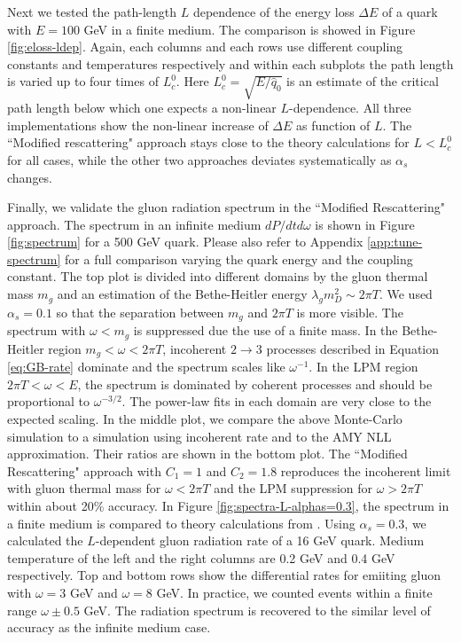 \documentclass[aps, prc, reprint, amsmath, groupedaddress, nofootinbib]{revtex4-1}
\begin{document}
Next we tested the path-length $L$ dependence of the energy loss $\Delta E$ of a quark with $E = 100$ GeV in a finite medium.
The comparison is showed in Figure \ref{fig:eloss-ldep}.
Again, each columns and each rows use different coupling constants and temperatures respectively and within each subplots the path length is varied up to four times of $L_c^0$.
Here $L_c^0 = \sqrt{E/\hat{q}_0}$ is an estimate of the critical path length below which one expects a non-linear $L$-dependence.
All three implementations show the non-linear increase of $\Delta E$ as function of $L$.
The ``Modified rescattering" approach stays close to the theory calculations for $L<L_c^0$ for all cases, while the other two approaches deviates systematically as $\alpha_s$ changes.

Finally, we validate the gluon radiation spectrum in the ``Modified Rescattering" approach. 
The spectrum in an infinite medium $dP/dtd\omega$ is shown in Figure \ref{fig:spectrum} for a 500 GeV quark.
Please also refer to Appendix \ref{app:tune-spectrum} for a full comparison varying the quark energy and the coupling constant.
The top plot is divided into different domains by the gluon thermal mass $m_g$ and an estimation of the Bethe-Heitler energy $\lambda_g m_D^2 \sim 2\pi T$.
We used $\alpha_s = 0.1$ so that the separation between $m_g$ and $2\pi T$ is more visible.
The spectrum with $\omega < m_g$ is suppressed due the use of a finite mass.
In the Bethe-Heitler region $m_g < \omega < 2\pi T$, incoherent $2\rightarrow 3$ processes described in Equation \ref{eq:GB-rate} dominate and the spectrum scales like $\omega^{-1}$.
In the LPM region $2\pi T < \omega < E$, the spectrum is dominated by coherent processes and should be proportional to $\omega^{-3/2}$.
The power-law fits in each domain are very close to the expected scaling.
In the middle plot, we compare the above Monte-Carlo simulation to a simulation using incoherent rate and to the AMY NLL approximation. 
Their ratios are shown in the bottom plot.
The ``Modified Rescattering" approach with $C_1 = 1$ and $C_2 = 1.8$ reproduces the incoherent limit with gluon thermal mass for $\omega < 2\pi T$ and the LPM suppression for $\omega > 2\pi T$ within about 20\% accuracy.
In Figure \ref{fig:spectra-L-alphas=0.3}, the spectrum in a finite medium is compared to theory calculations from \cite{CaronHuot:2008uh}.
Using $\alpha_s = 0.3$, we calculated the $L$-dependent gluon radiation rate of a 16 GeV quark.
Medium temperature of the left and the right columns are 0.2 GeV and 0.4 GeV respectively.
Top and bottom rows show the differential rates for emiiting gluon with $\omega = 3$ GeV and $\omega = 8$ GeV. 
In practice, we counted events within a finite range $\omega\pm 0.5$ GeV.
The radiation spectrum is recovered to the similar level of accuracy as the infinite medium case.
\end{document}

